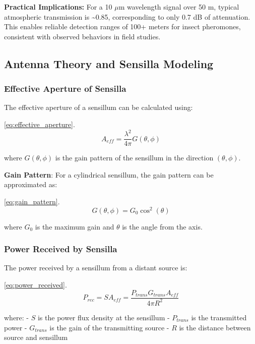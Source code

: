 \documentclass[
  13pt,
  a4paperpaper,
  12pt]{article}
\begin{document}
\textbf{Practical Implications:} For a 10 \(\mu\mathrm{m}\) wavelength
signal over 50 m, typical atmospheric transmission is
\textasciitilde0.85, corresponding to only 0.7 dB of attenuation. This
enables reliable detection ranges of 100+ meters for insect pheromones,
consistent with observed behaviors in field studies.

\subsection{Antenna Theory and Sensilla
Modeling}\label{antenna-theory-and-sensilla-modeling}

\subsubsection{Effective Aperture of
Sensilla}\label{effective-aperture-of-sensilla}

The effective aperture of a sensillum can be calculated using:

\eqref{eq:effective_aperture}. \begin{equation}
A_{eff} = \frac{\lambda^2}{4\pi} G(\theta, \phi) \label{eq:effective_aperture}
\end{equation}

where \(G(\theta, \phi)\) is the gain pattern of the sensillum in the
direction \((\theta, \phi)\).

\textbf{Gain Pattern}: For a cylindrical sensillum, the gain pattern can
be approximated as:

\eqref{eq:gain_pattern}. \begin{equation}
G(\theta, \phi) = G_0 \cos^2(\theta) \label{eq:gain_pattern}
\end{equation}

where \(G_0\) is the maximum gain and \(\theta\) is the angle from the
axis.

\subsubsection{Power Received by
Sensilla}\label{power-received-by-sensilla}

The power received by a sensillum from a distant source is:

\eqref{eq:power_received}. \begin{equation}
P_{rec} = S A_{eff} = \frac{P_{trans} G_{trans} A_{eff}}{4\pi R^2} \label{eq:power_received}
\end{equation}

where: - \(S\) is the power flux density at the sensillum -
\(P_{trans}\) is the transmitted power - \(G_{trans}\) is the gain of
the transmitting source - \(R\) is the distance between source and
sensillum
\end{document}
